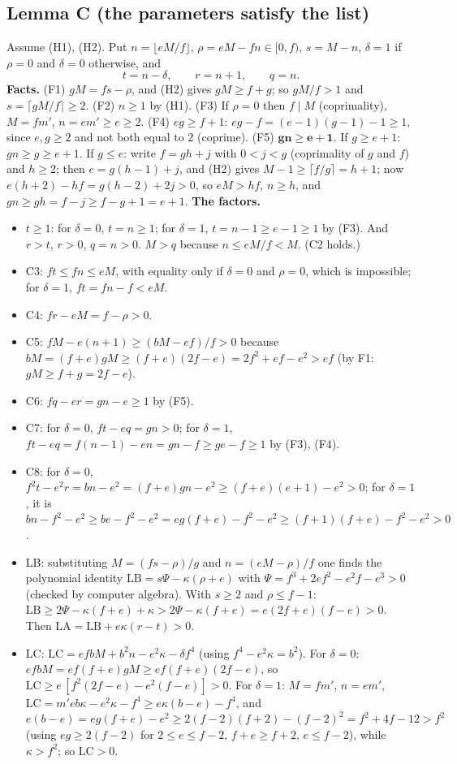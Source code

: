 \documentclass[11pt,reqno]{amsart}
\theoremstyle{plain}
\theoremstyle{definition}
\begin{document}
\subsection{Lemma C (the parameters satisfy the list)}
Assume (H1), (H2). Put $n=\lfloor eM/f\rfloor$, $\rho=eM-fn\in[0,f)$, $s=M-n$, $\delta=1$ if $\rho=0$ and $\delta=0$ otherwise, and
\[
t=n-\delta,\qquad r=n+1,\qquad q=n .
\]
\textbf{Facts.}
(F1) $gM=fs-\rho$, and (H2) gives $gM\ge f+g$; so $gM/f>1$ and $s=\lceil gM/f\rceil\ge2$.
(F2) $n\ge1$ by (H1).
(F3) If $\rho=0$ then $f\mid M$ (coprimality), $M=fm'$, $n=em'\ge e\ge2$.
(F4) $eg\ge f+1$: $eg-f=(e-1)(g-1)-1\ge1$, since $e,g\ge2$ and not both equal to $2$ (coprime).
(F5) $\boldsymbol{gn\ge e+1}$. If $g\ge e+1$: $gn\ge g\ge e+1$. If $g\le e$: write $f=gh+j$ with $0<j<g$ (coprimality of $g$ and $f$) and $h\ge2$; then $e=g(h-1)+j$, and (H2) gives $M-1\ge\lceil f/g\rceil=h+1$; now $e(h+2)-hf=g(h-2)+2j>0$, so $eM>hf$, $n\ge h$, and $gn\ge gh=f-j\ge f-g+1=e+1$.
\textbf{The factors.}
\begin{itemize}
\item $t\ge1$: for $\delta=0$, $t=n\ge1$; for $\delta=1$, $t=n-1\ge e-1\ge1$ by (F3). And $r>t$, $r>0$, $q=n>0$. $M>q$ because $n\le eM/f<M$. (C2 holds.)
\item C3: $ft\le fn\le eM$, with equality only if $\delta=0$ and $\rho=0$, which is impossible; for $\delta=1$, $ft=fn-f<eM$.
\item C4: $fr-eM=f-\rho>0$.
\item C5: $fM-e(n+1)\ge(bM-ef)/f>0$ because $bM=(f+e)gM\ge(f+e)(2f-e)=2f^2+ef-e^2>ef$ (by F1: $gM\ge f+g=2f-e$).
\item C6: $fq-er=gn-e\ge1$ by (F5).
\item C7: for $\delta=0$, $ft-eq=gn>0$; for $\delta=1$, $ft-eq=f(n-1)-en=gn-f\ge ge-f\ge1$ by (F3), (F4).
\item C8: for $\delta=0$, $f^2t-e^2r=bn-e^2=(f+e)gn-e^2\ge(f+e)(e+1)-e^2>0$; for $\delta=1$, it is $bn-f^2-e^2\ge be-f^2-e^2=eg(f+e)-f^2-e^2\ge(f+1)(f+e)-f^2-e^2>0$.
\item LB: substituting $M=(fs-\rho)/g$ and $n=(eM-\rho)/f$ one finds the polynomial identity $\mathrm{LB}=s\Psi-\kappa(\rho+e)$ with $\Psi=f^3+2ef^2-e^2f-e^3>0$ (checked by computer algebra). With $s\ge2$ and $\rho\le f-1$: $\mathrm{LB}\ge2\Psi-\kappa(f+e)+\kappa>2\Psi-\kappa(f+e)=e(2f+e)(f-e)>0$. Then LA$=\mathrm{LB}+e\kappa(r-t)>0$.
\item LC: $\mathrm{LC}=efbM+b^2n-e^2\kappa-\delta f^4$ (using $f^4-e^2\kappa=b^2$). For $\delta=0$: $efbM=ef(f+e)gM\ge ef(f+e)(2f-e)$, so $\mathrm{LC}\ge e\,[f^2(2f-e)-e^2(f-e)]>0$. For $\delta=1$: $M=fm'$, $n=em'$, $\mathrm{LC}=m'eb\kappa-e^2\kappa-f^4\ge e\kappa(b-e)-f^4$, and $e(b-e)=eg(f+e)-e^2\ge2(f-2)(f+2)-(f-2)^2=f^2+4f-12>f^2$ (using $eg\ge2(f-2)$ for $2\le e\le f-2$, $f+e\ge f+2$, $e\le f-2$), while $\kappa>f^2$; so $\mathrm{LC}>0$.
\end{itemize}
\end{document}
